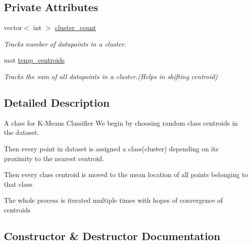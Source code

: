 \subsection*{Private Attributes}
\begin{DoxyCompactItemize}
\item 
\mbox{\label{classKMClassifier_a79f86197f23ebdb49be2dbfabade2415}} 
vector$<$ int $>$ \hyperlink{classKMClassifier_a79f86197f23ebdb49be2dbfabade2415}{cluster\+\_\+count}
\begin{DoxyCompactList}\small\item\em Tracks number of datapoints in a cluster. \end{DoxyCompactList}\item 
\mbox{\label{classKMClassifier_aa03707990827cf22657c609cef40b0f6}} 
mat \hyperlink{classKMClassifier_aa03707990827cf22657c609cef40b0f6}{temp\+\_\+centroids}
\begin{DoxyCompactList}\small\item\em Tracks the sum of all datapoints in a cluster.(Helps in shifting centroid) \end{DoxyCompactList}\end{DoxyCompactItemize}


\subsection{Detailed Description}
A class for K-\/\+Means Classifier We begin by choosing random class centroids in the dataset. 


\begin{DoxyItemize}
\item Then every point in dataset is assigned a class(cluster) depending on its proximity to the nearest centroid.
\item Then every class centroid is moved to the mean location of all points belonging to that class
\item The whole process is iterated multiple times with hopes of convergence of centroids 
\end{DoxyItemize}

\subsection{Constructor \& Destructor Documentation}
\mbox{\label{classKMClassifier_a5dbb59060646ab3dd794cc2f24c5d6c5}} 
